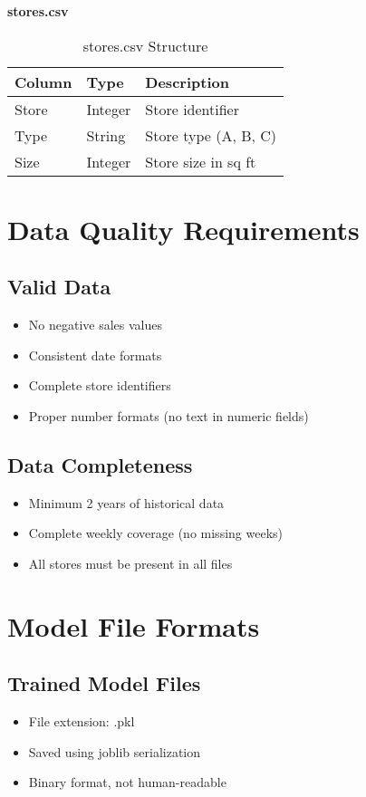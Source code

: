 \textbf{stores.csv}
\begin{table}[h]
	\centering
	\begin{tabular}{|l|l|l|}
		\hline
		\textbf{Column} & \textbf{Type} & \textbf{Description} \\
		\hline
		Store & Integer & Store identifier \\
		Type & String & Store type (A, B, C) \\
		Size & Integer & Store size in sq ft \\
		\hline
	\end{tabular}
	\caption{stores.csv Structure}
\end{table}

\section{Data Quality Requirements}

\subsection{Valid Data}
\begin{itemize}
	\item No negative sales values
	\item Consistent date formats
	\item Complete store identifiers
	\item Proper number formats (no text in numeric fields)
\end{itemize}

\subsection{Data Completeness}
\begin{itemize}
	\item Minimum 2 years of historical data
	\item Complete weekly coverage (no missing weeks)
	\item All stores must be present in all files
\end{itemize}

\section{Model File Formats}

\subsection{Trained Model Files}
\begin{itemize}
	\item File extension: .pkl
	\item Saved using joblib serialization
	\item Binary format, not human-readable
\end{itemize}

